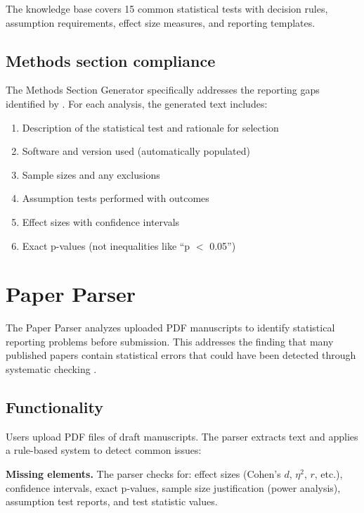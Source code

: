 \documentclass[article]{jss}
\begin{document}
The knowledge base covers 15 common statistical tests with decision rules, assumption requirements, effect size measures, and reporting templates.

\subsection{Methods section compliance}

The Methods Section Generator specifically addresses the reporting gaps identified by \citet{appelbaum2018jars}. For each analysis, the generated text includes:

\begin{enumerate}
\item Description of the statistical test and rationale for selection
\item Software and version used (automatically populated)
\item Sample sizes and any exclusions
\item Assumption tests performed with outcomes
\item Effect sizes with confidence intervals
\item Exact p-values (not inequalities like ``p $<$ 0.05'')
\end{enumerate}


\section{Paper Parser} \label{sec:parser}

The Paper Parser analyzes uploaded PDF manuscripts to identify statistical reporting problems before submission. This addresses the finding that many published papers contain statistical errors that could have been detected through systematic checking \citep{bakker2011misreporting}.

\subsection{Functionality}

Users upload PDF files of draft manuscripts. The parser extracts text and applies a rule-based system to detect common issues:

\textbf{Missing elements.} The parser checks for: effect sizes (Cohen's $d$, $\eta^2$, $r$, etc.), confidence intervals, exact p-values, sample size justification (power analysis), assumption test reports, and test statistic values.
\end{document}
